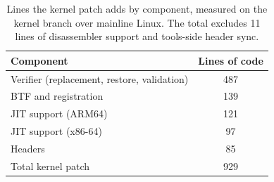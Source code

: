 \begin{table}[t]
\centering
\small
\caption{Lines the kernel patch adds by component, measured on the \tool kernel branch over mainline Linux. The total excludes 11 lines of disassembler support and tools-side header sync.}
\label{tab:kernel-loc}
\begin{tabular}{@{}lc@{}}
\toprule
Component & Lines of code \\
\midrule
Verifier (replacement, restore, validation) & 487 \\
BTF and registration & 139 \\
JIT support (ARM64) & 121 \\
JIT support (x86-64) & 97 \\
Headers & 85 \\
\midrule
Total kernel patch & 929 \\
\bottomrule
\end{tabular}
\end{table}